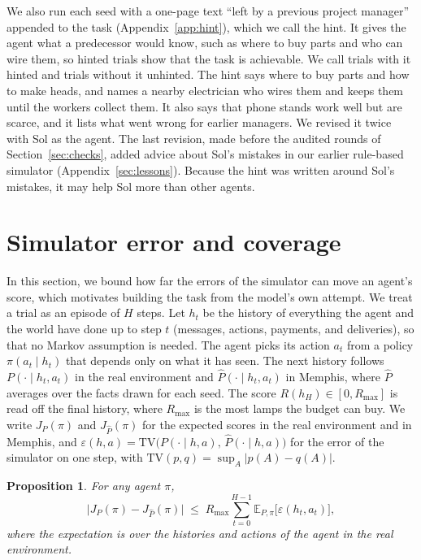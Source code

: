 \documentclass[10pt]{article}
\newtheorem{proposition}{Proposition}
\begin{document}
We also run each seed with a one-page text ``left by a previous project manager'' appended to the task
(Appendix~\ref{app:hint}), which we call the hint. It gives the agent what a predecessor would know, such as where to buy parts and who can wire them, so hinted trials show that the task is achievable. We call trials with it hinted and trials without it unhinted. The hint says where to buy parts and how to make heads, and names a nearby electrician who wires them and keeps them until the workers collect them. It also says that phone stands work well but are scarce, and it lists what went wrong for earlier managers. We revised it twice with Sol as the agent. The last revision, made before the audited rounds of Section~\ref{sec:checks}, added advice about Sol's mistakes in our earlier rule-based simulator (Appendix~\ref{sec:lessons}). Because the hint was written around Sol's mistakes, it may help Sol more than other agents.

\section{Simulator error and coverage}
\label{sec:theory}

In this section, we bound how far the errors of the simulator can move an agent's score, which motivates building the task from the model's own attempt. We treat a trial as an episode of $H$ steps. Let $h_t$ be the history of everything the agent and the world have done up to step
$t$ (messages, actions, payments, and deliveries), so that no Markov assumption is needed. The agent picks its action $a_t$ from a policy
$\pi(a_t \mid h_t)$ that depends only on what it has seen. The next history follows $P(\cdot \mid h_t, a_t)$ in the real environment and $\hat P(\cdot \mid h_t, a_t)$ in Memphis, where $\hat P$ averages over the facts drawn for each seed. The score
$R(h_H) \in [0, R_{\max}]$ is read off the final history, where $R_{\max}$ is the most lamps the budget can buy. We write $J_P(\pi)$ and $J_{\hat P}(\pi)$ for the expected scores in the real environment and in Memphis, and
$\varepsilon(h,a) = \mathrm{TV}\big(P(\cdot \mid h,a),\, \hat P(\cdot \mid h,a)\big)$ for the error of the simulator on one step, with $\mathrm{TV}(p,q) = \sup_A |p(A) - q(A)|$.

\begin{proposition}
\label{prop:sim}
For any agent $\pi$,
\begin{equation}
  \big|J_P(\pi) - J_{\hat P}(\pi)\big| \;\le\; R_{\max} \sum_{t=0}^{H-1} \mathbb{E}_{P,\pi}\big[\varepsilon(h_t, a_t)\big],
  \label{eq:sim}
\end{equation}
where the expectation is over the histories and actions of the agent in the real environment.
\end{proposition}
\end{document}

